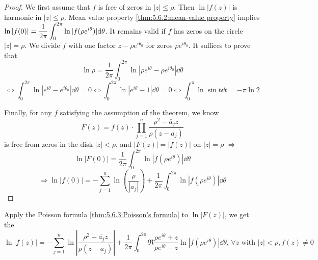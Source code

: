 \begin{proof}
    We first assume that  $ f  $ is free of zeros in  $ |z| \leq \rho $. Then  $ \ln |f(z)|  $ is harmonic in  $ |z| \leq \rho $. Mean value property \ref{thm:5.6.2:mean-value property} implies  $ \ln|f(0)|=\displaystyle\frac{1}{2\pi }\int_0^{2\pi} \ln |f(\rho e^{i\theta})| \mathrm{d}\theta $. It remains valid if  $  f  $ has zeros on the circle  $ |z|=\rho $. We divide  $ f  $ with one factor  $ z-\rho e^{i\theta_0} $ for zeros  $ \rho e^{i\theta_0} $. It suffices to prove that 
    \[\ln \rho=\frac{1}{2\pi}\int_0^{2\pi}\ln|\rho e^{i\theta}-\rho e^{i\theta_0}|\dd\theta\]
    \[\Leftrightarrow\int_0^{2\pi}\ln|e^{i\theta}-e^{i\theta_0}|\dd\theta=0\Leftrightarrow\int_0^{2\pi}\ln|e^{i\theta}-1|\dd\theta=0\Leftrightarrow\int_0^{\pi}\ln\sin t\dd t=-\pi \ln 2\]
    
    Finally, for any  $ f  $ satisfying the assumption of the theorem, we know 
    \begin{equation}
        F(z)=f(z)\cdot\prod_{j=1}^n\frac{\rho^2-\bar{a}_jz}{\rho(z-a_j)}
    \end{equation}
    is free from zeros in the disk  $ |z|<\rho $, and  $ |F(z)|=|f(z)|  $ on  $ |z|=\rho $ $ \Rightarrow $
    \[\ln|F(0)|=\frac{1}{2\pi}\int_0^{2\pi}\ln|f(\rho e^{i\theta})|\dd\theta\]
    \[\Rightarrow \ln|f(0)|=-\sum_{j=1}^n\ln\left(\frac{\rho}{|a_j|}\right)+\frac{1}{2\pi}\int_0^{2\pi}\ln|f(\rho e^{i\theta})|\dd\theta\]  
\end{proof}
\begin{remark}
    Apply the Poisson formula \ref{thm:5.6.3:Poisson's formula} to  $ \ln|F(z)| $, we get the  
    \begin{equation}\label{eq:5.3.1:Poisson-Jensen formula}
        \ln|f(z)|=-\sum_{j=1}^n\ln\left|\frac{\rho^2-\overline{a_j}z}{\rho(z-a_j)}\right|+\frac{1}{2\pi}\int_0^{2\pi}\Re\frac{\rho e^{i\theta}+z}{\rho e^{i\theta}-z}\ln|f(\rho e^{i\theta})|\dd\theta,\,\forall z\text{ with }|z|<\rho,f(z)\neq 0
    \end{equation}
\end{remark}